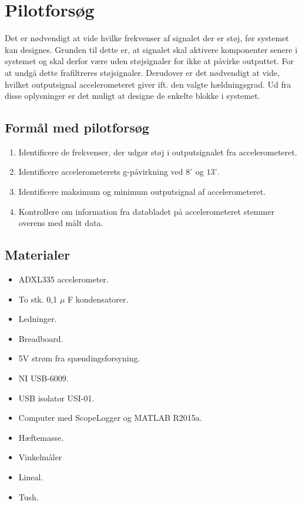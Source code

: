 \section{Pilotforsøg}
Det er nødvendigt at vide hvilke frekvenser af signalet der er støj, før systemet kan designes. Grunden til dette er, at signalet skal aktivere komponenter senere i systemet og skal derfor være uden støjsignaler for ikke at påvirke outputtet. For at undgå dette frafiltreres støjsignaler. Derudover er det nødvendigt at vide, hvilket outputsignal accelerometeret giver ift. den valgte hældningsgrad. Ud fra disse oplysninger er det muligt at designe de enkelte blokke i systemet.%

\subsection{Formål med pilotforsøg}
\begin{enumerate}
\item Identificere de frekvenser, der udgør støj i outputsignalet fra accelerometeret.
\item Identificere accelerometerets g-påvirkning ved $8^{\circ}$ og $13^{\circ}$.
\item Identificere maksimum og minimum outputsignal af accelerometeret.
\item Kontrollere om information fra databladet på accelerometeret stemmer overens med målt data.
\end{enumerate}

\subsection{Materialer}
\begin{itemize}
\item ADXL335 accelerometer.
\item To stk. 0,1 $\mu$ F kondensatorer.
\item Ledninger.
\item Breadboard.
\item 5V strøm fra spændingsforsyning.
\item NI USB-6009.
\item USB isolator USI-01.
\item Computer med ScopeLogger og MATLAB R2015a.
\item Hæftemasse.
\item Vinkelmåler
\item Lineal.
\item Tush.
\end{itemize}

